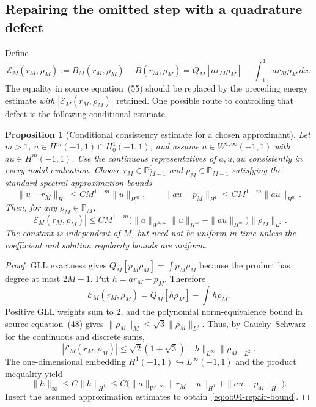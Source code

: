 \documentclass[11pt,a4paper]{amsart}
\theoremstyle{remark}
\theoremstyle{plain}
\newtheorem{proposition}{Proposition}[section]
\theoremstyle{remark}
\numberwithin{equation}{section}
\begin{document}
\subsection{Repairing the omitted step with a quadrature defect}
Define
\begin{equation}\label{eq:ob04-defect}
 \mathcal E_M(r_M,\rho_M):=B_M(r_M,\rho_M)-B(r_M,\rho_M)
 =Q_M[a r_M\rho_M]-\int_{-1}^1 a r_M\rho_M\,dx.
\end{equation}
The equality in source equation~(55) should be replaced by the preceding energy estimate \emph{with} $|\mathcal E_M(r_M,\rho_M)|$ retained. One possible route to controlling that defect is the following conditional estimate.

\begin{proposition}[Conditional consistency estimate for a chosen approximant]\label{prop:ob04-repair}
Let $m>1$, $u\in H^m(-1,1)\cap H_0^1(-1,1)$, and assume $a\in W^{1,\infty}(-1,1)$ with $au\in H^m(-1,1)$. Use the continuous representatives of $a,u,au$ consistently in every nodal evaluation. Choose $r_M\in\mathbb P^0_{M-1}$ and $p_M\in\mathbb P_{M-1}$ satisfying the standard spectral approximation bounds
\[
 \|u-r_M\|_{H^1}\le C M^{1-m}\|u\|_{H^m},\qquad
 \|au-p_M\|_{H^1}\le C M^{1-m}\|au\|_{H^m}.
\]
Then, for any $\rho_M\in\mathbb P_M$,
\begin{equation}\label{eq:ob04-repair-bound}
 |\mathcal E_M(r_M,\rho_M)|\le
 C M^{1-m}\bigl(\|a\|_{W^{1,\infty}}\|u\|_{H^m}
 +\|au\|_{H^m}\bigr)\|\rho_M\|_{L^2}.
\end{equation}
The constant is independent of $M$, but need not be uniform in time unless the coefficient and solution regularity bounds are uniform.
\end{proposition}
\begin{proof}
GLL exactness gives $Q_M[p_M\rho_M]=\int p_M\rho_M$ because the product has degree at most $2M-1$. Put $h=a r_M-p_M$. Therefore
\[
 \mathcal E_M(r_M,\rho_M)=Q_M[h\rho_M]-\int h\rho_M.
\]
Positive GLL weights sum to $2$, and the polynomial norm-equivalence bound in source equation~(48) gives $\|\rho_M\|_M\le\sqrt3\|\rho_M\|_{L^2}$. Thus, by Cauchy--Schwarz for the continuous and discrete sums,
\[
 |\mathcal E_M(r_M,\rho_M)|\le
 \sqrt2(1+\sqrt3)\|h\|_{L^\infty}\|\rho_M\|_{L^2}.
\]
The one-dimensional embedding $H^1(-1,1)\hookrightarrow L^\infty(-1,1)$ and the product inequality yield
\[
 \|h\|_\infty\le C\|h\|_{H^1}\le
 C\bigl(\|a\|_{W^{1,\infty}}\|r_M-u\|_{H^1}
 +\|au-p_M\|_{H^1}\bigr).
\]
Insert the assumed approximation estimates to obtain~\eqref{eq:ob04-repair-bound}.
\end{proof}
\end{document}

